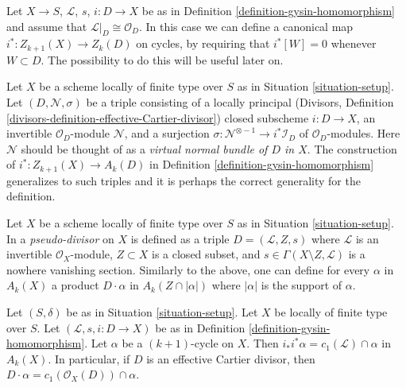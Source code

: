 \begin{remark}
\label{remark-on-cycles}
Let $X \to S$, $\mathcal{L}$, $s$, $i : D \to X$ be as in
Definition \ref{definition-gysin-homomorphism} and assume
that $\mathcal{L}|_D \cong \mathcal{O}_D$. In this case we
can define a canonical map $i^* : Z_{k + 1}(X) \to Z_k(D)$
on cycles, by requiring that $i^*[W] = 0$ whenever $W \subset D$.
The possibility to do this will be useful later on.
\end{remark}

\begin{remark}
\label{remark-generalize-to-virtual}
Let $X$ be a scheme locally of finite type over $S$ as in
Situation \ref{situation-setup}. Let $(D, \mathcal{N}, \sigma)$
be a triple consisting of a locally principal (Divisors, Definition
\ref{divisors-definition-effective-Cartier-divisor}) closed subscheme
$i : D \to X$, an invertible $\mathcal{O}_D$-module $\mathcal{N}$, and
a surjection $\sigma : \mathcal{N}^{\otimes -1} \to i^*\mathcal{I}_D$
of $\mathcal{O}_D$-modules. Here $\mathcal{N}$ should be thought of as
a {\it virtual normal bundle of $D$ in $X$}. The construction of
$i^* : Z_{k + 1}(X) \to A_k(D)$ in
Definition \ref{definition-gysin-homomorphism}
generalizes to such triples and it is perhaps the correct generality
for the definition.
\end{remark}

\begin{remark}
\label{remark-generalize-to-pseudo-divisor}
Let $X$ be a scheme locally of finite type over $S$ as in
Situation \ref{situation-setup}. In \cite{F} a {\it pseudo-divisor} on $X$
is defined as a triple $D = (\mathcal{L}, Z, s)$ where $\mathcal{L}$
is an invertible $\mathcal{O}_X$-module, $Z \subset X$ is a closed subset,
and $s \in \Gamma(X \setminus Z, \mathcal{L})$ is a nowhere vanishing
section. Similarly to the above, one can define for every $\alpha$
in $A_k(X)$ a product $D \cdot \alpha$ in $A_k(Z \cap |\alpha|)$
where $|\alpha|$ is the support of $\alpha$.
\end{remark}

\begin{lemma}
\label{lemma-support-cap-effective-Cartier}
Let $(S, \delta)$ be as in Situation \ref{situation-setup}. Let $X$ be locally
of finite type over $S$. Let $(\mathcal{L}, s, i : D \to X)$ be as in
Definition \ref{definition-gysin-homomorphism}. Let $\alpha$ be a
$(k + 1)$-cycle on $X$. Then $i_*i^*\alpha = c_1(\mathcal{L}) \cap \alpha$
in $A_k(X)$. In particular, if $D$ is an effective Cartier divisor, then
$D \cdot \alpha = c_1(\mathcal{O}_X(D)) \cap \alpha$.
\end{lemma}


